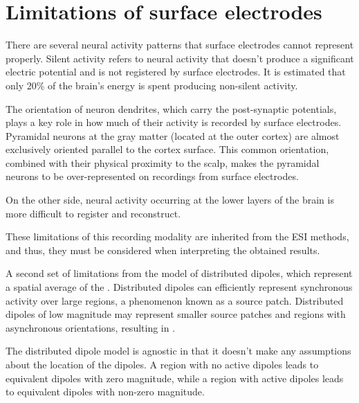 \section{Limitations of surface electrodes}



There are several neural activity patterns that surface electrodes cannot represent properly.
%
Silent activity refers to neural activity that doesn't produce a significant electric potential and is not registered by surface electrodes.
%
It is estimated that only 20\% of the brain's energy is spent producing non-silent activity.

The orientation of neuron dendrites, which carry the post-synaptic potentials, plays a key role in how much of their activity is recorded by surface electrodes.
%
Pyramidal neurons at the gray matter (located at the outer cortex) are almost exclusively oriented parallel to the cortex surface.
%
This common orientation, combined with their physical proximity to the scalp, makes the pyramidal neurons to be over-represented on recordings from surface electrodes.

On the other side, neural activity occurring at the lower layers of the brain is more difficult to register and reconstruct.

These limitations of this recording modality are inherited from the ESI methods, and thus, they must be considered when interpreting the obtained results.

A second set of limitations from the model of distributed dipoles, which represent a spatial average of the .
%
Distributed dipoles can efficiently represent synchronous activity over large regions, a phenomenon known as a source patch.
%
Distributed dipoles of low magnitude may represent smaller source patches and regions with asynchronous orientations, resulting in .




%
The distributed dipole model is agnostic in that it doesn't make any assumptions about the location of the dipoles.
%
A region with no active dipoles leads to equivalent dipoles with zero magnitude, while a region with active dipoles leads to equivalent dipoles with non-zero magnitude.
